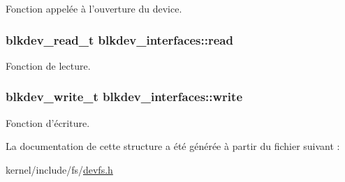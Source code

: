 Fonction appelée à l'ouverture du device. \hypertarget{structblkdev__interfaces_ad14a2ad714105cdb8ce002eb4fb9e747}{
\subsubsection[{read}]{\setlength{\rightskip}{0pt plus 5cm}blkdev\-\_\-read\-\_\-t blkdev\-\_\-interfaces\-::read}}\label{structblkdev__interfaces_ad14a2ad714105cdb8ce002eb4fb9e747}
Fonction de lecture. \hypertarget{structblkdev__interfaces_ae99fb7e1529ef6c24df9dc454bc0f9f6}{
\subsubsection[{write}]{\setlength{\rightskip}{0pt plus 5cm}blkdev\-\_\-write\-\_\-t blkdev\-\_\-interfaces\-::write}}\label{structblkdev__interfaces_ae99fb7e1529ef6c24df9dc454bc0f9f6}
Fonction d'écriture. 

La documentation de cette structure a été générée à partir du fichier suivant \-:\begin{DoxyCompactItemize}
\item 
kernel/include/fs/\hyperlink{devfs_8h}{devfs.\-h}\end{DoxyCompactItemize}
